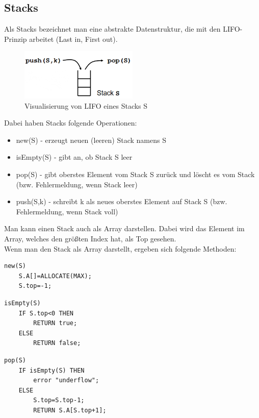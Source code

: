 \documentclass{article}
\begin{document}
        \subsection{Stacks}
            Als Stacks bezeichnet man eine abstrakte Datenstruktur, die mit den LIFO- Prinzip arbeitet (Last in, First out). 
            \begin{figure}[ht]
                \centering
                \includegraphics[width=0.5\textwidth]{Bilder/LIFOStacks.png}
                \caption{Visualisierung von LIFO eines Stacks S}
                \label{fig:LIFO}
            \end{figure}
            Dabei haben Stacks folgende Operationen: 
            \begin{itemize}
                \item new(S) - erzeugt neuen (leeren) Stack namens S
                \item isEmpty(S) - gibt an, ob Stack S leer
                \item pop(S) - gibt oberstes Element vom Stack S zurück und löscht es vom Stack (bzw. Fehlermeldung, wenn Stack leer)
                \item push(S,k) - schreibt k als neues oberstes Element auf Stack S (bzw. Fehlermeldung, wenn Stack voll)
            \end{itemize}
            Man kann einen Stack auch als Array darstellen. Dabei wird das Element im Array, welches den größten Index hat, als Top gesehen. \\
            Wenn man den Stack als Array darstellt, ergeben sich folgende Methoden:
            \begin{lstlisting}[style=pseudocode]
new(S)
    S.A[]=ALLOCATE(MAX);
    S.top=-1;
            \end{lstlisting}
            \begin{lstlisting}[style=pseudocode]
isEmpty(S)
    IF S.top<0 THEN
        RETURN true;
    ELSE
        RETURN false;
            \end{lstlisting}
            \begin{lstlisting}[style=pseudocode]
pop(S)
    IF isEmpty(S) THEN
        error "underflow";
    ELSE
        S.top=S.top-1;
        RETURN S.A[S.top+1];
            \end{lstlisting}
\end{document}
